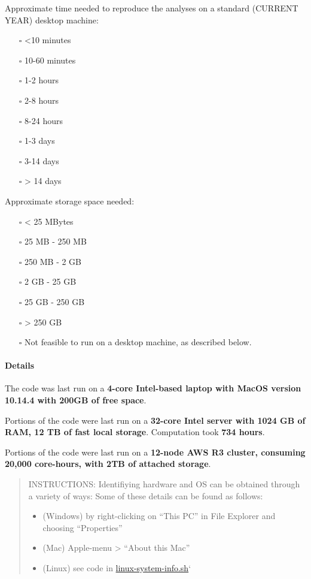 \documentclass[
]{article}
\providecommand{\tightlist}{%
  \setlength{\itemsep}{0pt}\setlength{\parskip}{0pt}}
\begin{document}
Approximate time needed to reproduce the analyses on a standard (CURRENT
YEAR) desktop machine:

\begin{itemize}
\tightlist
\item[$\square$]
  \textless10 minutes
\item[$\square$]
  10-60 minutes
\item[$\square$]
  1-2 hours
\item[$\square$]
  2-8 hours
\item[$\square$]
  8-24 hours
\item[$\square$]
  1-3 days
\item[$\square$]
  3-14 days
\item[$\square$]
  \textgreater{} 14 days
\end{itemize}

Approximate storage space needed:

\begin{itemize}
\item[$\square$]
  \textless{} 25 MBytes
\item[$\square$]
  25 MB - 250 MB
\item[$\square$]
  250 MB - 2 GB
\item[$\square$]
  2 GB - 25 GB
\item[$\square$]
  25 GB - 250 GB
\item[$\square$]
  \textgreater{} 250 GB
\item[$\square$]
  Not feasible to run on a desktop machine, as described below.
\end{itemize}

\hypertarget{details}{%
\paragraph{Details}\label{details}}

The code was last run on a \textbf{4-core Intel-based laptop with MacOS
version 10.14.4 with 200GB of free space}.

Portions of the code were last run on a \textbf{32-core Intel server
with 1024 GB of RAM, 12 TB of fast local storage}. Computation took
\textbf{734 hours}.

Portions of the code were last run on a \textbf{12-node AWS R3 cluster,
consuming 20,000 core-hours, with 2TB of attached storage}.

\begin{quote}
INSTRUCTIONS: Identifiying hardware and OS can be obtained through a
variety of ways: Some of these details can be found as follows:

\begin{itemize}
\tightlist
\item
  (Windows) by right-clicking on ``This PC'' in File Explorer and
  choosing ``Properties''
\item
  (Mac) Apple-menu \textgreater{} ``About this Mac''
\item
  (Linux) see code in
  \href{https://github.com/AEADataEditor/replication-template/blob/master/tools/linux-system-info.sh}{linux-system-info.sh}`
\end{itemize}
\end{quote}
\end{document}
